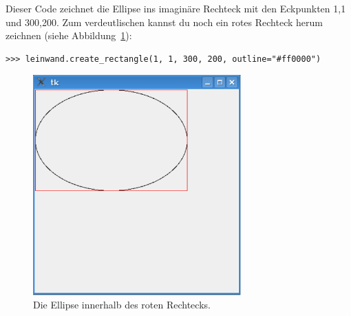 Dieser Code zeichnet die Ellipse ins imaginäre Rechteck mit den Eckpunkten 1,1 und 300,200. Zum verdeutlischen kannst du noch ein rotes Rechteck herum zeichnen (siehe Abbildung~\ref{fig39}):

\begin{Verbatim}[frame=single]
>>> leinwand.create_rectangle(1, 1, 300, 200, outline="#ff0000")
\end{Verbatim}


\begin{figure}
\begin{center}
\includegraphics[width=80mm]{images/figure39}
\end{center}
\caption{Die Ellipse innerhalb des roten Rechtecks.}\label{fig39}
\end{figure}

